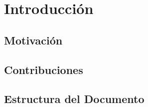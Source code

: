 \chapter{Introducción}
\label{chap:intro}


\section{Motivación}
\label{chap:intro.1}


\section{Contribuciones}
\label{chap:intro.2}

\section{Estructura del Documento}
\label{chap:intro.3}

